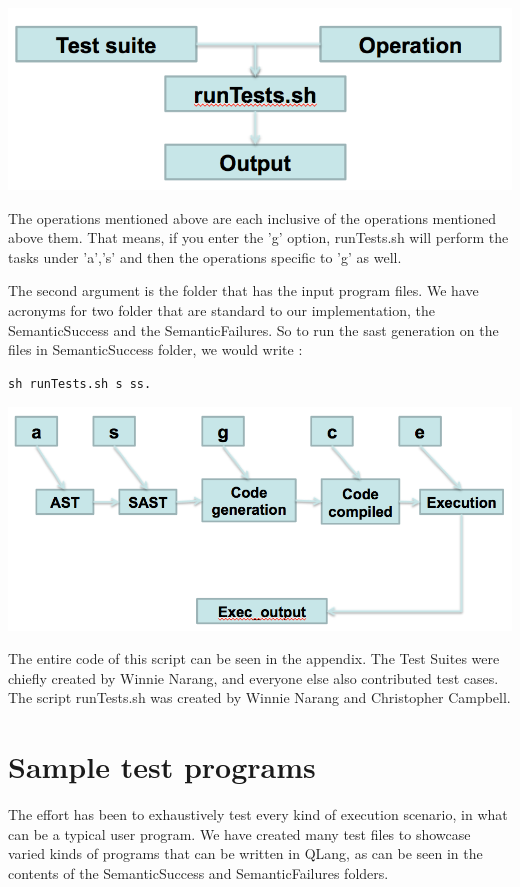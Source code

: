 \includegraphics[scale=0.60]{Test_diagrams/2.png}

The operations mentioned above are each inclusive of the operations mentioned above them. That means, if you enter the 'g' option, runTests.sh will perform the tasks under 'a','s' and then the operations specific to 'g' as well.

The second argument is the folder that has the input program files. We have acronyms for two folder that are standard to our implementation, the SemanticSuccess and the SemanticFailures. So to run the sast generation on the files in SemanticSuccess folder, we would write :
\\
\begin{lstlisting}
sh runTests.sh s ss.
\end{lstlisting}

\includegraphics[scale=0.60]{Test_diagrams/1.png}


The entire code of this script can be seen in the appendix. The Test Suites were chiefly created by Winnie Narang, and everyone else also contributed test cases. The script runTests.sh was created by Winnie Narang and Christopher Campbell.


\section{Sample test programs}

The effort has been to exhaustively test every kind of execution scenario, in what can be a typical user program. We have created many test files to showcase varied kinds of programs that can be written in QLang, as can be seen in the contents of the SemanticSuccess and SemanticFailures folders.

